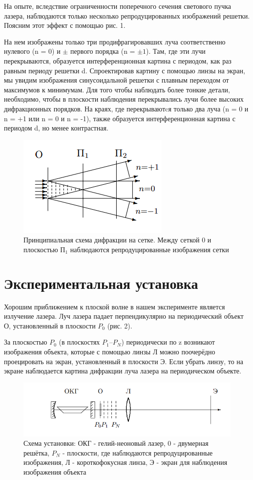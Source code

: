 \documentclass[a4paper,12pt]{article}
\begin{document}
На опыте, вследствие ограниченности поперечного сечения светового пучка лазера, наблюдаются только несколько репродуцированных изображений решетки. Поясним этот эффект с помощью рис. 1. 

На нем изображены только три продифрагировавших луча соответственно нулевого (n = 0) и $\pm$ первого порядка (n = $\pm 1$). Там, где эти лучи перекрываются, образуется интерференционная картина с периодом, как раз равным периоду решетки d.
Спроектировав картину с помощью линзы на экран, мы увидим изображения синусоидальной решетки с плавным переходом от максимумов к минимумам. Для того чтобы наблюдать более тонкие детали, необходимо, чтобы в плоскости наблюдения перекрывались лучи более высоких дифракционных порядков. На краях, где перекрываютcя только два луча (n = 0 и n = +1 или n = 0 и n = -1), также образуется интерференционная картина с периодом d, но менее контрастная.
\begin{figure}[H]
\centering
\includegraphics[scale=1]{scheme1.png}
\caption{Принципиальная схема дифракции на сетке. Между сеткой 0 и плоскостью $\text{П}_1$ наблюдаются репродуцированные изображения сетки}
\end{figure}
\section{Экспериментальная установка}
Хорошим приближением к плоской волне в нашем эксперименте является излучение лазера. Луч лазера падает перпендикулярно на периодический объект О, установленный в плоскости $P_0$ (рис. 2).

За плоскостью $P_0$ (в плоскостях $P_1$–$P_N$) периодически по z возникают изображения объекта, которые с помощью линзы Л можно поочерёдно проецировать на экран, установленный в плоскости Э. Если убрать линзу, то на экране наблюдается картина дифракции луча лазера на периодическом объекте.

\begin{figure}[H]
\includegraphics[scale=1]{scheme2.png}
\caption{Схема установки: ОКГ - гелий-неоновый лазер, 0 - двумерная решётка, $P_N$ - плоскости, где наблюдаются репродуцированные изображения, Л - короткофокусная линза, Э - экран для наблюдения изображения объекта}
\end{figure}
\end{document}
